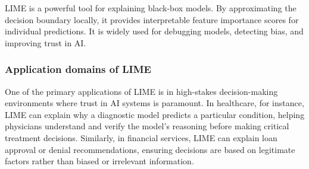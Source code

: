 LIME is a powerful tool for explaining black-box models. By approximating the decision boundary locally, it provides interpretable feature importance scores for individual predictions. It is widely used for debugging models, detecting bias, and improving trust in AI.

\subsubsection{Application domains of LIME}
One of the primary applications of LIME is in high-stakes decision-making environments where trust in AI systems is paramount. In healthcare, for instance, LIME can explain why a diagnostic model predicts a particular condition, helping physicians understand and verify the model's reasoning before making critical treatment decisions. Similarly, in financial services, LIME can explain loan approval or denial recommendations, ensuring decisions are based on legitimate factors rather than biased or irrelevant information. 







